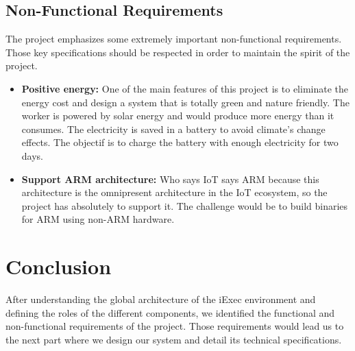     \subsection{Non-Functional Requirements}
        The project emphasizes some extremely important non-functional requirements. Those key specifications should be
        respected in order to maintain the spirit of the project.
        \begin{itemize}
            \item \textbf{Positive energy:} One of the main features of this project is to eliminate the energy cost and
            design a system that is totally green and nature friendly. The worker is powered by solar energy and would
            produce more energy than it consumes. The electricity is saved in a battery to avoid climate's change effects.
            The objectif is to charge the battery with enough electricity for two days.

            \item \textbf{Support ARM architecture:} Who says IoT says ARM\cite{ARM} because this architecture is the
            omnipresent architecture in the IoT ecosystem, so the project has absolutely to support it. The challenge
            would be to build binaries for ARM using non-ARM hardware.
        \end{itemize}

\section{Conclusion}
    After understanding the global architecture of the iExec environment and defining the roles of the different components,
    we identified the functional and non-functional requirements of the project. Those requirements would lead us to the next
    part where we design our system and detail its technical specifications.